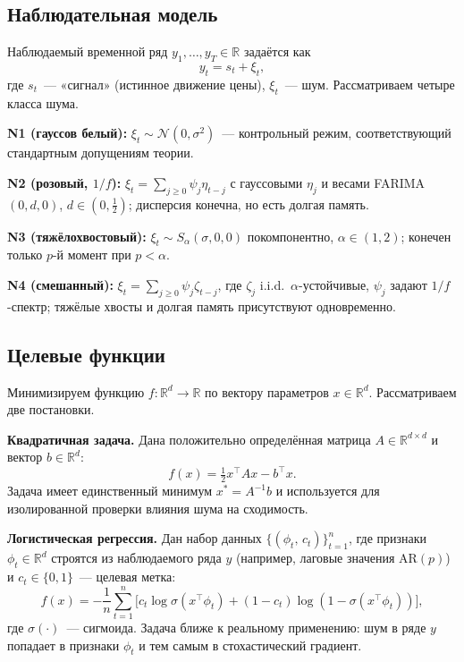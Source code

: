 \documentclass[conference]{IEEEtran}
\begin{document}
\subsection{Наблюдательная модель}

Наблюдаемый временной ряд $y_1,\dots,y_T\in\mathbb{R}$ задаётся как
\begin{equation}
  y_t = s_t + \xi_t,
  \label{eq:model}
\end{equation}
где $s_t$~--- «сигнал» (истинное движение цены), $\xi_t$~--- шум.
Рассматриваем четыре класса шума.

\textbf{N1 (гауссов белый):} $\xi_t \sim \mathcal{N}(0,\sigma^2)$~---
контрольный режим, соответствующий стандартным допущениям теории.

\textbf{N2 (розовый, $1/f$):}
$\xi_t = \sum_{j\ge0}\psi_j\eta_{t-j}$
с гауссовыми $\eta_j$ и весами FARIMA$(0,d,0)$,
$d\in(0,\tfrac{1}{2})$; дисперсия конечна, но есть долгая память.

\textbf{N3 (тяжёлохвостовый):}
$\xi_t \sim S_\alpha(\sigma,0,0)$ покомпонентно,
$\alpha\in(1,2)$; конечен только $p$-й момент при $p<\alpha$.

\textbf{N4 (смешанный):}
$\xi_t = \sum_{j\ge0}\psi_j\zeta_{t-j}$, где $\zeta_j$ i.i.d.\
$\alpha$-устойчивые, $\psi_j$ задают $1/f$-спектр; тяжёлые хвосты и
долгая память присутствуют одновременно.

\subsection{Целевые функции}

Минимизируем функцию $f:\mathbb{R}^d\to\mathbb{R}$ по вектору параметров
$x\in\mathbb{R}^d$. Рассматриваем две постановки.

\textbf{Квадратичная задача.} Дана положительно определённая матрица
$A\in\mathbb{R}^{d\times d}$ и вектор $b\in\mathbb{R}^d$:
\begin{equation}
  f(x) = \tfrac{1}{2}x^\top A x - b^\top x.
  \label{eq:quadratic}
\end{equation}
Задача имеет единственный минимум $x^* = A^{-1}b$ и используется для
изолированной проверки влияния шума на сходимость.

\textbf{Логистическая регрессия.} Дан набор данных
$\{(\phi_t,\,c_t)\}_{t=1}^{n}$, где признаки $\phi_t\in\mathbb{R}^d$
строятся из наблюдаемого ряда $y$ (например, лаговые значения AR$(p)$)
и $c_t\in\{0,1\}$~--- целевая метка:
\begin{equation}
  f(x) = -\frac{1}{n}\sum_{t=1}^{n}
    \bigl[c_t\log\sigma(x^\top\phi_t)
         +(1-c_t)\log(1-\sigma(x^\top\phi_t))\bigr],
  \label{eq:logreg}
\end{equation}
где $\sigma(\cdot)$~--- сигмоида. Задача ближе к реальному применению:
шум в ряде $y$ попадает в признаки $\phi_t$ и тем самым в стохастический
градиент.
\end{document}
